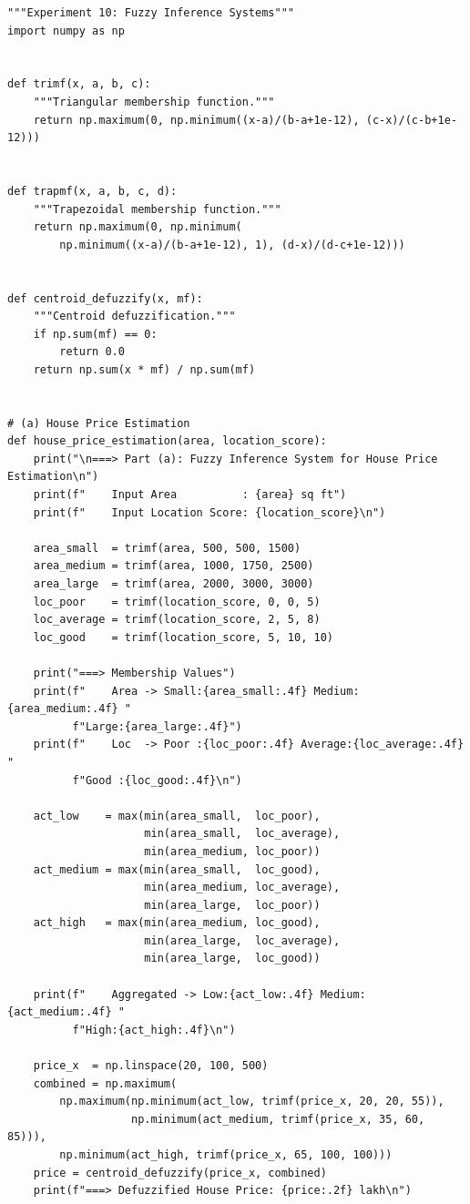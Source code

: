 \documentclass[12pt,a4paper]{article}
\begin{document}
\begin{lstlisting}
"""Experiment 10: Fuzzy Inference Systems"""
import numpy as np


def trimf(x, a, b, c):
    """Triangular membership function."""
    return np.maximum(0, np.minimum((x-a)/(b-a+1e-12), (c-x)/(c-b+1e-12)))


def trapmf(x, a, b, c, d):
    """Trapezoidal membership function."""
    return np.maximum(0, np.minimum(
        np.minimum((x-a)/(b-a+1e-12), 1), (d-x)/(d-c+1e-12)))


def centroid_defuzzify(x, mf):
    """Centroid defuzzification."""
    if np.sum(mf) == 0:
        return 0.0
    return np.sum(x * mf) / np.sum(mf)


# (a) House Price Estimation
def house_price_estimation(area, location_score):
    print("\n===> Part (a): Fuzzy Inference System for House Price Estimation\n")
    print(f"    Input Area          : {area} sq ft")
    print(f"    Input Location Score: {location_score}\n")

    area_small  = trimf(area, 500, 500, 1500)
    area_medium = trimf(area, 1000, 1750, 2500)
    area_large  = trimf(area, 2000, 3000, 3000)
    loc_poor    = trimf(location_score, 0, 0, 5)
    loc_average = trimf(location_score, 2, 5, 8)
    loc_good    = trimf(location_score, 5, 10, 10)

    print("===> Membership Values")
    print(f"    Area -> Small:{area_small:.4f} Medium:{area_medium:.4f} "
          f"Large:{area_large:.4f}")
    print(f"    Loc  -> Poor :{loc_poor:.4f} Average:{loc_average:.4f} "
          f"Good :{loc_good:.4f}\n")

    act_low    = max(min(area_small,  loc_poor),
                     min(area_small,  loc_average),
                     min(area_medium, loc_poor))
    act_medium = max(min(area_small,  loc_good),
                     min(area_medium, loc_average),
                     min(area_large,  loc_poor))
    act_high   = max(min(area_medium, loc_good),
                     min(area_large,  loc_average),
                     min(area_large,  loc_good))

    print(f"    Aggregated -> Low:{act_low:.4f} Medium:{act_medium:.4f} "
          f"High:{act_high:.4f}\n")

    price_x  = np.linspace(20, 100, 500)
    combined = np.maximum(
        np.maximum(np.minimum(act_low, trimf(price_x, 20, 20, 55)),
                   np.minimum(act_medium, trimf(price_x, 35, 60, 85))),
        np.minimum(act_high, trimf(price_x, 65, 100, 100)))
    price = centroid_defuzzify(price_x, combined)
    print(f"===> Defuzzified House Price: {price:.2f} lakh\n")



\end{lstlisting}
\end{document}
